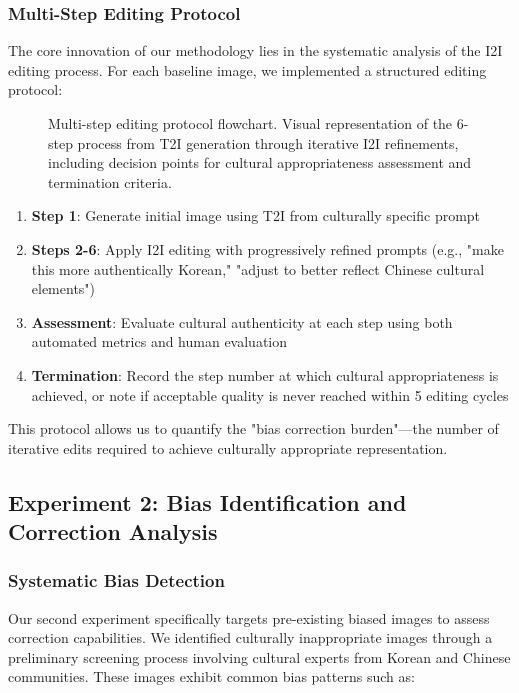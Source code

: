 \documentclass{article}
\begin{document}
\subsubsection{Multi-Step Editing Protocol}
The core innovation of our methodology lies in the systematic analysis of the I2I editing process. For each baseline image, we implemented a structured editing protocol:

\begin{figure}[h]
  \centering
  \fbox{\rule[-.5cm]{0cm}{5cm} \rule[-.5cm]{12cm}{0cm}}
  \caption{Multi-step editing protocol flowchart. Visual representation of the 6-step process from T2I generation through iterative I2I refinements, including decision points for cultural appropriateness assessment and termination criteria.}
  \label{fig:editing-protocol}
\end{figure}

\begin{enumerate}
\item \textbf{Step 1}: Generate initial image using T2I from culturally specific prompt
\item \textbf{Steps 2-6}: Apply I2I editing with progressively refined prompts (e.g., "make this more authentically Korean," "adjust to better reflect Chinese cultural elements")
\item \textbf{Assessment}: Evaluate cultural authenticity at each step using both automated metrics and human evaluation
\item \textbf{Termination}: Record the step number at which cultural appropriateness is achieved, or note if acceptable quality is never reached within 5 editing cycles
\end{enumerate}

This protocol allows us to quantify the "bias correction burden"—the number of iterative edits required to achieve culturally appropriate representation.

\subsection{Experiment 2: Bias Identification and Correction Analysis}

\subsubsection{Systematic Bias Detection}
Our second experiment specifically targets pre-existing biased images to assess correction capabilities. We identified culturally inappropriate images through a preliminary screening process involving cultural experts from Korean and Chinese communities. These images exhibit common bias patterns such as:
\end{document}
